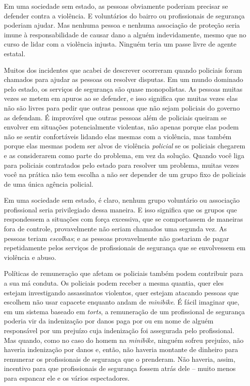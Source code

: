 Em uma sociedade sem estado, as pessoas obviamente poderiam precisar se defender contra a violência. E voluntários do bairro ou profissionais de segurança poderiam ajudar. Mas nenhuma pessoa e nenhuma associação de proteção seria imune à responsabilidade de causar dano a alguém indevidamente, mesmo que no curso de lidar com a violência injusta. Ninguém teria um passe livre de agente estatal.

Muitos dos incidentes que acabei de descrever ocorreram quando policiais foram chamados para ajudar as pessoas ou resolver disputas. Em um mundo dominado pelo estado, os serviços de segurança são quase monopolistas. As pessoas muitas vezes se metem em apuros ao se defender, e isso significa que muitas vezes elas não são livres para pedir que outras pessoas que não sejam policiais do governo as defendam. É improvável que outras pessoas além de policiais queiram se envolver em situações potencialmente violentas, não apenas porque elas podem não se sentir confortáveis lidando elas mesmas com a violência, mas também porque elas mesmas podem ser alvos de violência \emph{policial} se os policiais chegarem e as considerarem como parte do problema, em vez da solução. Quando você liga para policiais contratados pelo estado para resolver um problema, muitas vezes você na prática não tem escolha a não ser depender de um grupo fixo de policiais de uma única agência policial. 

Em uma sociedade sem estado, é claro, nenhum grupo voluntário ou associação profissional seria privilegiado dessa maneira. E isso significa que os grupos que respondessem a situações com força excessiva, que se comportassem de maneiras fora de controle, provavelmente não seriam chamados uma segunda vez. As pessoas teriam \emph{escolhas}; e as pessoas provavelmente não gostariam de pagar repetidamente pelos serviços de profissionais de segurança que se envolvessem em violência e abuso.

Políticas de remuneração que afetam os policiais também podem contribuir para a sua má conduta. Os policiais podem receber a mesma quantia, quer eles estejam investigando assassinatos violentos, quer estejam atacando pessoas que escolhem não usar capacete enquanto andam de \emph{minibike}. É fácil imaginar que, em um sistema baseado em \emph{torts}, a remuneração de um profissional de segurança poderia vir da indenização por danos paga por ou em nome de alguém responsável por um prejuízo cuja indenização foi assegurada pelo profissional. Mas quando, como no caso do homem na \emph{minibike}, ninguém sofreu prejuízo, não haveria indenização por danos e, então, não haveria montante de dinheiro para remunerar os profissionais de segurança que o prenderam. Não haveria, assim, incentivo para que profissionais de segurança fossem atrás dele -- muito menos para espancar ele e os vários espectadores.

